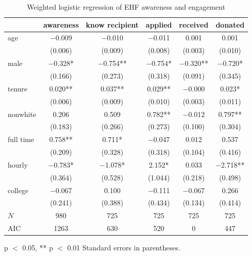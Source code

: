 \documentclass[
  11pt,
  oneside]{article}
\begin{document}
\begin{table}
\centering
\caption{\label{tab:ACNT-aware-calcs}Weighted logistic regression of EHF awareness and engagement \label{tab:tab-awareness-model-wmt}}
\centering
\begin{threeparttable}
\begin{tabular}[t]{lccccc}
\toprule
  & awareness & know recipient & applied & received & donated\\
\midrule
age & \num{-0.009} & \num{-0.010} & \num{-0.011} & \num{0.001} & \num{0.001}\\
 & (\num{0.006}) & (\num{0.009}) & (\num{0.008}) & (\num{0.003}) & (\num{0.010})\\
male & \num{-0.328}* & \num{-0.754}** & \num{-0.754}* & \num{-0.320}** & \num{-0.720}*\\
 & (\num{0.166}) & (\num{0.273}) & (\num{0.318}) & (\num{0.091}) & (\num{0.345})\\
tenure & \num{0.020}** & \num{0.037}** & \num{0.029}** & \num{-0.000} & \num{0.023}*\\
 & (\num{0.006}) & (\num{0.009}) & (\num{0.010}) & (\num{0.003}) & (\num{0.011})\\
nonwhite & \num{0.206} & \num{0.509} & \num{0.782}** & \num{-0.012} & \num{0.797}**\\
 & (\num{0.183}) & (\num{0.266}) & (\num{0.273}) & (\num{0.100}) & (\num{0.304})\\
full time & \num{0.758}** & \num{0.711}* & \num{-0.047} & \num{0.012} & \num{0.537}\\
 & (\num{0.209}) & (\num{0.328}) & (\num{0.318}) & (\num{0.104}) & (\num{0.416})\\
hourly & \num{-0.783}* & \num{-1.078}* & \num{2.152}* & \num{0.033} & \num{-2.718}**\\
 & (\num{0.364}) & (\num{0.528}) & (\num{1.044}) & (\num{0.218}) & (\num{0.498})\\
college & \num{-0.067} & \num{0.100} & \num{-0.111} & \num{-0.067} & \num{0.266}\\
 & (\num{0.241}) & (\num{0.388}) & (\num{0.434}) & (\num{0.134}) & (\num{0.414})\\
\midrule
$N$ & \num{980} & \num{725} & \num{725} & \num{725} & \num{725}\\
AIC & \num{1263} & \num{630} & \num{520} & \num{0} & \num{447}\\
\bottomrule
\end{tabular}
\begin{tablenotes}
\item * p $<$ 0.05, ** p $<$ 0.01 Standard errors in parentheses.
\end{tablenotes}
\end{threeparttable}
\end{table}
\end{document}

